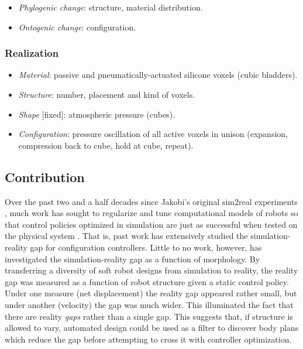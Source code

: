\begin{itemize}
    \item \textit{Phylogenic change}: structure, material distribution.
    \item \textit{Ontogenic change}: configuration.
\end{itemize}

\subsubsection*{Realization}

\begin{itemize}
    \item \textit{Material}: passive and pneumatically-actuated silicone voxels (cubic bladders).
    \item \textit{Structure}: number, placement and kind of voxels.
    \item \textit{Shape} [fixed]: atmospheric pressure (cubes).
    \item \textit{Configuration}: pressure oscillation of all active voxels in unison (expansion, compression back to cube, hold at cube, repeat).
\end{itemize}



\subsection{Contribution}


Over the past two and a half decades since Jakobi's original sim2real experiments \cite{jakobi1995noise},
much work has sought to regularize and tune computational models of robots
so that control policies optimized in simulation are just as successful when tested on the physical system \cite{bongard2006resilient,hwangbo2019learning}.
That is, past work has extensively studied the simulation-reality gap for configuration controllers.
Little to no work, however, has investigated the simulation-reality gap as a function of morphology.
By transferring a diversity of soft robot designs from simulation to reality, the reality gap was measured as a function of robot structure given a static control policy.
Under one measure (net displacement) the reality gap appeared rather small, but under another (velocity) the gap was much wider.
This illuminated the fact that there are reality \textit{gaps} rather than a single gap.
This suggests that, if structure is allowed to vary, automated design could be used as a filter to discover body plans which reduce the gap before attempting to cross it with controller optimization.

